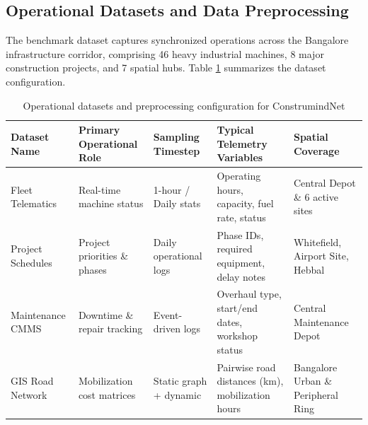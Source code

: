 \documentclass[pdflatex,sn-mathphys,Numbered]{sn-jnl}%
\begin{document}
\subsection{Operational Datasets and Data Preprocessing}
The benchmark dataset captures synchronized operations across the Bangalore infrastructure corridor, comprising 46 heavy industrial machines, 8 major construction projects, and 7 spatial hubs. Table \ref{tab3} summarizes the dataset configuration.

\begin{table}[t]
\caption{Operational datasets and preprocessing configuration for ConstrumindNet}\label{tab3}
\begin{tabular*}{\textwidth}{@{\extracolsep\fill}lllll@{\extracolsep\fill}}
\toprule
Dataset Name & Primary Operational Role & Sampling Timestep & Typical Telemetry Variables & Spatial Coverage \\
\midrule
Fleet Telematics & Real-time machine status & 1-hour / Daily stats & Operating hours, capacity, fuel rate, status & Central Depot \& 6 active sites \\
Project Schedules & Project priorities \& phases & Daily operational logs & Phase IDs, required equipment, delay notes & Whitefield, Airport Site, Hebbal \\
Maintenance CMMS & Downtime \& repair tracking & Event-driven logs & Overhaul type, start/end dates, workshop status & Central Maintenance Depot \\
GIS Road Network & Mobilization cost matrices & Static graph + dynamic & Pairwise road distances (km), mobilization hours & Bangalore Urban \& Peripheral Ring \\
\bottomrule
\end{tabular*}
\end{table}
\end{document}
